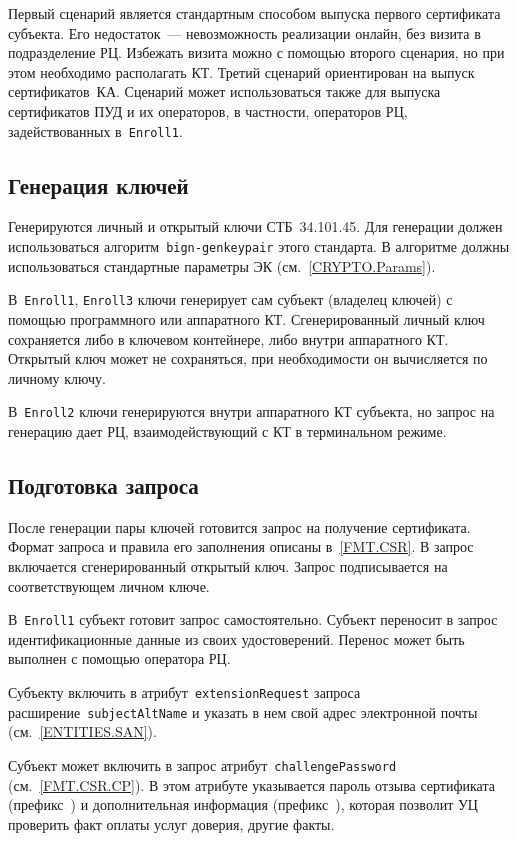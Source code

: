Первый сценарий является стандартным способом выпуска первого сертификата
субъекта.  Его недостаток~--- невозможность реализации онлайн, 
без визита в подразделение РЦ. 
%
Избежать визита можно с помощью второго сценария, но при этом необходимо 
располагать КТ.
%
Третий сценарий ориентирован на выпуск сертификатов~КА.
%
Сценарий может использоваться также для выпуска сертификатов ПУД и их 
операторов, в частности, операторов РЦ, задействованных 
в~\texttt{Enroll1}.

\subsection{Генерация ключей}\label{PROCESSES.Enroll.Gen}

Генерируются личный и открытый ключи СТБ~34.101.45.
Для генерации должен использоваться алгоритм~\texttt{bign-genkeypair}
этого стандарта. В алгоритме должны использоваться 
стандартные параметры ЭК (см.~\ref{CRYPTO.Params}).

В~\texttt{Enroll1}, \texttt{Enroll3} ключи генерирует сам субъект 
(владелец ключей) с помощью программного или аппаратного КТ. 
Сгенерированный личный ключ сохраняется либо в ключевом контейнере, 
либо внутри аппаратного КТ. Открытый ключ может не сохраняться, 
при необходимости он вычисляется по личному ключу.

В~\texttt{Enroll2} ключи генерируются внутри аппаратного КТ субъекта,
но запрос на генерацию дает РЦ, взаимодействующий с КТ в терминальном 
режиме. 

\subsection{Подготовка запроса}\label{PROCESSES.Enroll.CSR}

После генерации пары ключей готовится запрос на получение сертификата. 
Формат запроса и правила его заполнения описаны в~\ref{FMT.CSR}. 
В запрос включается сгенерированный открытый ключ. Запрос подписывается на 
соответствующем личном ключе.

В~\texttt{Enroll1} субъект готовит запрос самостоятельно.
Субъект переносит в запрос идентификационные данные из своих 
удостоверений. Перенос может быть выполнен с помощью оператора РЦ.

Субъекту  включить 
в атрибут~\texttt{extensionRequest} запроса расширение~\texttt{subjectAltName} 
и указать в нем свой адрес электронной почты (см.~\ref{ENTITIES.SAN}).

Субъект может включить в запрос атрибут~\texttt{challengePassword} 
(см.~\ref{FMT.CSR.CP}). В этом атрибуте указывается пароль отзыва 
сертификата (префикс~) и дополнительная информация 
(префикс~), которая позволит УЦ проверить факт оплаты услуг 
доверия, другие факты. 
%

